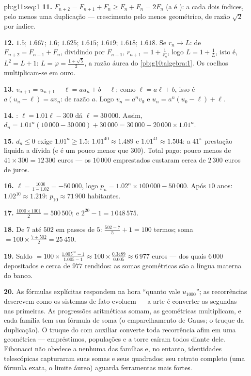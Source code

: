 \begin{solution}{pb:g11:seq:1}
\textbf{11.} $F_{n+2} = F_{n+1} + F_n \geq F_n + F_n = 2F_n$ (a
 é ): a cada dois índices, pelo menos uma
duplicação --- crescimento pelo menos geométrico, de razão
$\sqrt2$ por índice.

\textbf{12.} $1.5$; $1.667$; $1.6$; $1.625$; $1.615$;
$1.619$; $1.618$; $1.618$. Se $r_n \to L$: de
$F_{n+2} = F_{n+1} + F_n$, dividindo por $F_{n+1}$,
$r_{n+1} = 1 + \frac{1}{r_n}$, logo $L = 1 + \frac1L$, isto é,
$L^2 = L + 1$: $L = \varphi = \frac{1 + \sqrt5}{2}$, a razão
áurea do \cref{pb:g10:algebra:1}. Os coelhos multiplicam-se em
ouro.

\textbf{13.} $v_{n+1} = u_{n+1} - \ell = a u_n + b - \ell$;
como $\ell = a\ell + b$, isso é $a(u_n - \ell) = a v_n$:
 de razão $a$. Logo $v_n = a^n v_0$ e
$u_n = a^n (u_0 - \ell) + \ell$.

\textbf{14.} : $\ell = 1.01\ell - 300$ dá
$\ell = 30\,000$. Assim,
$d_n = 1.01^n (10\,000 - 30\,000) + 30\,000
= 30\,000 - 20\,000 \times 1.01^n$.

\textbf{15.} $d_n \leq 0$ exige $1.01^n \geq 1.5$:
$1.01^{40} \approx 1.489$ e $1.01^{41} \approx 1.504$: a
$41^{\text{a}}$ prestação liquida a dívida (e é um pouco menor
que $300$). Total pago: pouco menos de
$41 \times 300 = 12\,300$ euros --- os $10\,000$ emprestados
custaram cerca de $2\,300$ euros de juros.

\textbf{16.}  $\ell = \frac{1000}{1 - 1.02} =
-50\,000$, logo $p_n = 1.02^n \times 100\,000 - 50\,000$. Após
$10$ anos: $1.02^{10} \approx 1.219$:
$p_{10} \approx 71\,900$ habitantes.

\textbf{17.} $\frac{1000 \times 1001}{2} = 500\,500$; e
$2^{20} - 1 = 1\,048\,575$.

\textbf{18.} De $7$ até $502$ em passos de $5$:
$\frac{502 - 7}{5} + 1 = 100$ termos; soma
$= 100 \times \frac{7 + 502}{2} = 25\,450$.

\textbf{19.} Saldo $= 100 \times \frac{1.005^{60} - 1}
{1.005 - 1} \approx 100 \times \frac{0.3489}{0.005} \approx
6\,977$ euros --- dos quais $6\,000$ depositados e cerca de
$977$ rendidos: as somas geométricas são a língua materna do
banco.

\textbf{20.} As fórmulas explícitas respondem na hora ``quanto
vale $u_{1000}$''; as recorrências descrevem como os sistemas de
fato evoluem --- a arte é converter as segundas nas primeiras.
As progressões aritméticas somam, as geométricas multiplicam, e
cada família tem sua fórmula de soma (o emparelhamento de
Gauss; o truque da duplicação). O truque do  com
 auxiliar converte toda recorrência afim em uma
geométrica --- empréstimos, populações e a torre caíram todos
diante dele. Fibonacci não obedece a nenhuma das famílias e, no
entanto, identidades telescópicas capturaram suas somas e seus
quadrados; seu retrato completo (uma fórmula exata, o limite
áureo) aguarda ferramentas mais fortes.
\end{solution}
